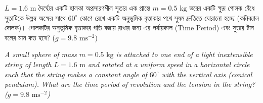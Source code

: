 \documentclass[12pt, a4paper]{article}
\begin{document}
\begin{tcolorbox}[questionbox={প্রশ্ন (Question) 48}]
    \noindent
    $L = 1.6\text{ m}$ দৈর্ঘ্যের একটি হালকা অপ্রসারণশীল সুতার এক প্রান্তে $m = 0.5\text{ kg}$ ভরের একটি ক্ষুদ্র গোলক বেঁধে সুতাটিকে উল্লম্ব অক্ষের সাথে $60^\circ$ কোণে রেখে একটি অনুভূমিক বৃত্তাকার পথে সুষম দ্রুতিতে ঘোরানো হচ্ছে (কনিক্যাল দোলক)। গোলকটির অনুভূমিক বৃত্তাকার গতি বজায় রাখার জন্য এর পর্যায়কাল (Time Period) এবং সুতার টান বলের মান কত হবে? ($g = 9.8\text{ ms}^{-2}$)
    
    \vspace{0.8em}
    \begin{english}
    \noindent\textit{\color{darkgray}
    A small sphere of mass $m = 0.5\text{ kg}$ is attached to one end of a light inextensible string of length $L = 1.6\text{ m}$ and rotated at a uniform speed in a horizontal circle such that the string makes a constant angle of $60^\circ$ with the vertical axis (conical pendulum). What are the time period of revolution and the tension in the string? ($g = 9.8\text{ ms}^{-2}$)
    }
    \end{english}
\end{tcolorbox}

\vspace{1em}
\begin{center}
\end{center}
\vspace{1em}
\end{document}

